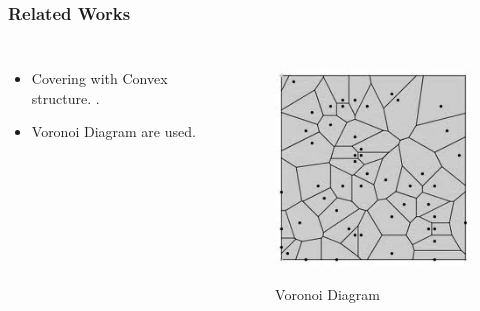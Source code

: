 \documentclass[blue]{beamer}
\begin{document}
\begin{frame}
 \frametitle{Related Works}
 \begin{columns}
    \begin{itemize}
    \item Covering with Convex structure. \cite{GSSB}.
    \item Voronoi Diagram are used.
    \end{itemize}
    
     \begin{figure}[H]
     \caption{Voronoi Diagram}
        \centering
           \scalebox{0.6}
          {\includegraphics[width=\linewidth]{cover40.png}}
     \end{figure}
 \end{columns}

\end{frame}
\end{document}
